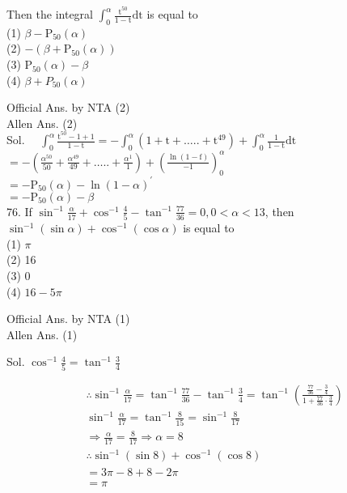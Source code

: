 \documentclass[10pt]{article}
\begin{document}
Then the integral \(\int_{0}^{\alpha} \frac{\mathrm{t}^{50}}{1-\mathrm{t}} \mathrm{dt}\) is equal to\\
(1) \(\beta-\mathrm{P}_{50}(\alpha)\)\\
(2) \(-\left(\beta+\mathrm{P}_{50}(\alpha)\right)\)\\
(3) \(\mathrm{P}_{50}(\alpha)-\beta\)\\
(4) \(\beta+P_{50}(\alpha)\)

Official Ans. by NTA (2)\\
Allen Ans. (2)\\
Sol. \(\quad \int_{0}^{\alpha} \frac{\mathrm{t}^{50}-1+1}{1-\mathrm{t}}=-\int_{0}^{\alpha}\left(1+\mathrm{t}+\ldots . .+\mathrm{t}^{49}\right)+\int_{0}^{\alpha} \frac{1}{1-\mathrm{t}} \mathrm{dt}\)\\
\(=-\left(\frac{\alpha^{50}}{50}+\frac{\alpha^{49}}{49}+\ldots . .+\frac{\alpha^{1}}{1}\right)+\left(\frac{\ln (1-\mathrm{f})}{-1}\right)_{0}^{\alpha}\)\\
\(=-\mathrm{P}_{50}(\alpha)-\ln (1-\alpha)^{\prime}\)\\
\(=-\mathrm{P}_{50}(\alpha)-\beta\)\\
76. If \(\sin ^{-1} \frac{\alpha}{17}+\cos ^{-1} \frac{4}{5}-\tan ^{-1} \frac{77}{36}=0,0<\alpha<13\), then \(\sin ^{-1}(\sin \alpha)+\cos ^{-1}(\cos \alpha)\) is equal to\\
(1) \(\pi\)\\
(2) 16\\
(3) 0\\
(4) \(16-5 \pi\)

Official Ans. by NTA (1)\\
Allen Ans. (1)

Sol. \(\cos ^{-1} \frac{4}{5}=\tan ^{-1} \frac{3}{4}\)

\[
\begin{aligned}
& \therefore \sin ^{-1} \frac{\alpha}{17}=\tan ^{-1} \frac{77}{36}-\tan ^{-1} \frac{3}{4}=\tan ^{-1}\left(\frac{\frac{77}{36}-\frac{3}{4}}{1+\frac{77}{36} \cdot \frac{3}{4}}\right) \\
& \sin ^{-1} \frac{\alpha}{17}=\tan ^{-1} \frac{8}{15}=\sin ^{-1} \frac{8}{17} \\
& \Rightarrow \frac{\alpha}{17}=\frac{8}{17} \Rightarrow \alpha=8 \\
& \therefore \sin ^{-1}(\sin 8)+\cos ^{-1}(\cos 8) \\
& =3 \pi-8+8-2 \pi \\
& =\pi
\end{aligned}
\]
\end{document}
